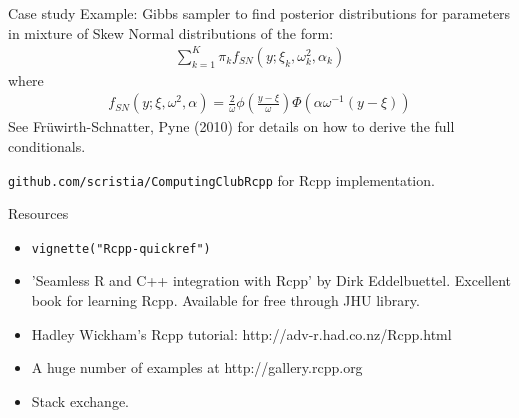\documentclass{beamer}\usepackage[]{graphicx}\usepackage[]{color}
\begin{document}
\begin{frame}[fragile]{Case study}
    \vspace{0.5em}
Example: Gibbs sampler to find posterior distributions for parameters in
mixture of Skew Normal distributions of the form:
\begin{align}
    \sum_{k=1}^{K} \pi_k f_{SN}(y; \xi_k, \omega_k^2, \alpha_k)
\end{align}
where
\begin{align}
    f_{SN}(y; \xi, \omega^2, \alpha) = \frac{2}{\omega} \phi\left( \frac{y - \xi}{\omega}\right) \Phi(\alpha \omega^{-1}(y - \xi))
\end{align}
See Fr{\"u}wirth-Schnatter, Pyne (2010) for details on how to derive the full conditionals.
\par
{\tt github.com/scristia/ComputingClubRcpp} for Rcpp implementation.
\end{frame}
\begin{frame}[fragile]{Resources}
    \vspace{0.5em}
    \begin{itemize}\itemsep1em
        \item {\tt vignette("Rcpp-quickref")}
        \item 'Seamless R and C++ integration with Rcpp' by Dirk Eddelbuettel.
            Excellent book for learning Rcpp. Available for free through
            JHU library.
        \item Hadley Wickham's Rcpp tutorial:
            http://adv-r.had.co.nz/Rcpp.html
        \item A huge number of examples at http://gallery.rcpp.org
        \item Stack exchange.
    \end{itemize}
\end{frame}
\end{document}

